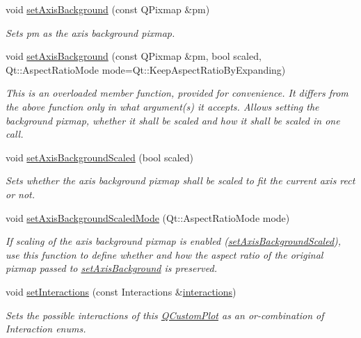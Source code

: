 \begin{DoxyCompactItemize}
void \hyperlink{a00116_a6e61739de7485e99171c0fd5a57e27aa}{set\+Axis\+Background} (const Q\+Pixmap \&pm)
\begin{DoxyCompactList}\small\item\em Sets {\itshape pm} as the axis background pixmap. \end{DoxyCompactList}\item 
void \hyperlink{a00116_a010330bf3686716b9f7d643b3f5205db}{set\+Axis\+Background} (const Q\+Pixmap \&pm, bool scaled, Qt\+::\+Aspect\+Ratio\+Mode mode=Qt\+::\+Keep\+Aspect\+Ratio\+By\+Expanding)
\begin{DoxyCompactList}\small\item\em This is an overloaded member function, provided for convenience. It differs from the above function only in what argument(s) it accepts. Allows setting the background pixmap, whether it shall be scaled and how it shall be scaled in one call. \end{DoxyCompactList}\item 
void \hyperlink{a00116_a55ad8c13d7db8b5c2f15d694773a43a3}{set\+Axis\+Background\+Scaled} (bool scaled)
\begin{DoxyCompactList}\small\item\em Sets whether the axis background pixmap shall be scaled to fit the current axis rect or not. \end{DoxyCompactList}\item 
void \hyperlink{a00116_a82920d0db6cc36214dc4a9dfe386d1a1}{set\+Axis\+Background\+Scaled\+Mode} (Qt\+::\+Aspect\+Ratio\+Mode mode)
\begin{DoxyCompactList}\small\item\em If scaling of the axis background pixmap is enabled (\hyperlink{a00116_a55ad8c13d7db8b5c2f15d694773a43a3}{set\+Axis\+Background\+Scaled}), use this function to define whether and how the aspect ratio of the original pixmap passed to \hyperlink{a00116_a010330bf3686716b9f7d643b3f5205db}{set\+Axis\+Background} is preserved. \end{DoxyCompactList}\item 
void \hyperlink{a00116_add9cc886ff5257f64fb4117cf6c135fe}{set\+Interactions} (const Interactions \&\hyperlink{a00116_aa9966a7b4022af4909a34d9a31f6b229}{interactions})
\begin{DoxyCompactList}\small\item\em Sets the possible interactions of this \hyperlink{a00030_d8/d00/a00186}{Q\+Custom\+Plot} as an or-\/combination of Interaction enums. \end{DoxyCompactList}\item 

\end{DoxyCompactItemize}
